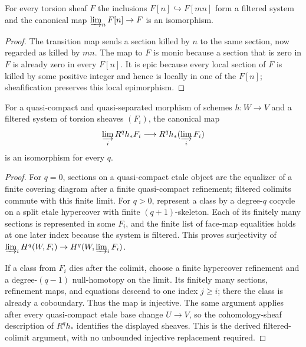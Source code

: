 \begin{lemma}
\label{lemma:weil-pbc-torsion-filtered-union}
\uses{}
For every torsion sheaf $F$ the inclusions $F[n]\hookrightarrow F[mn]$ form a
filtered system and the canonical map $\varinjlim_nF[n]\to F$ is an
isomorphism.
\end{lemma}
\begin{proof}
\uses{} 
The transition map sends a section killed by $n$ to the same section, now
regarded as killed by $mn$.  The map to $F$ is monic because a section that is
zero in $F$ is already zero in every $F[n]$.  It is epic because every local
section of $F$ is killed by some positive integer and hence is locally in one
of the $F[n]$; sheafification preserves this local epimorphism.
\end{proof}

\begin{lemma}
\label{lemma:weil-pbc-direct-image-filtered-colimit}
\uses{}
For a quasi-compact and quasi-separated morphism of schemes $h:W\to V$ and a
filtered system of torsion sheaves $(F_i)$, the canonical map
\[
 \varinjlim_i R^qh_*F_i\longrightarrow R^qh_*(\varinjlim_iF_i)
\]
is an isomorphism for every $q$.
\end{lemma}
\begin{proof}
\uses{} 
For $q=0$, sections on a quasi-compact etale object are the equalizer of a
finite covering diagram after a finite quasi-compact refinement; filtered
colimits commute with this finite limit.  For $q>0$, represent a class by a
degree-$q$ cocycle on a split etale hypercover with finite $(q+1)$-skeleton.
Each of its finitely many sections is represented in some $F_i$, and the
finite list of face-map equalities holds at one later index because the system
is filtered.  This proves surjectivity of
$\varinjlim_iH^q(W,F_i)\to H^q(W,\varinjlim_iF_i)$.

If a class from $F_i$ dies after the colimit, choose a finite hypercover
refinement and a degree-$(q-1)$ null-homotopy on the limit.  Its finitely many
sections, refinement maps, and equations descend to one index $j\geq i$;
there the class is already a coboundary.  Thus the map is injective.  The
same argument applies after every quasi-compact etale base change
$U\to V$, so the cohomology-sheaf description of $R^qh_*$ identifies the
displayed sheaves.  This is the derived filtered-colimit argument, with no
unbounded injective replacement required.
\end{proof}

